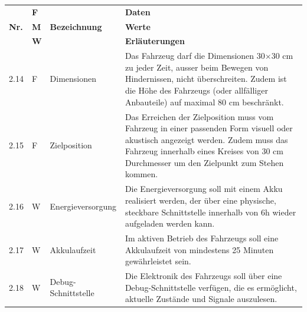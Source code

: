 \documentclass[../main.tex]{subfiles}
\begin{document}
\newpage

\begin{tabular}{|l|p{0.5cm}|p{4cm}|p{10cm}|}
  \hline
               & \textbf{F} &                           & \textbf{Daten}                                                                                                                                                                                                              \\
  \textbf{Nr.} & \textbf{M} & \textbf{Bezeichnung}      & \textbf{Werte}                                                                                                                                                                                                              \\
               & \textbf{W} &                           & \textbf{Erläuterungen}                                                                                                                                                                                                      \\
  \hline
  2.14         & F          & Dimensionen               & Das Fahrzeug darf die Dimensionen 30$\times$30 cm zu jeder Zeit, ausser beim Bewegen von Hindernissen, nicht überschreiten. Zudem ist die Höhe des Fahrzeugs (oder allfälliger Anbauteile) auf maximal 80 cm beschränkt.    \\
  \hline
  2.15         & F          & Zielposition              & Das Erreichen der Zielposition muss vom Fahrzeug in einer passenden Form visuell oder akustisch angezeigt werden. Zudem muss das Fahrzeug innerhalb eines Kreises von 30 cm Durchmesser um den Zielpunkt zum Stehen kommen. \\
  \hline
  2.16         & W          & Energieversorgung         & Die Energieversorgung soll mit einem Akku realisiert werden, der über eine physische, steckbare Schnittstelle innerhalb von 6h wieder aufgeladen werden kann.                                                               \\
  \hline
  2.17         & W          & Akkulaufzeit              & Im aktiven Betrieb des Fahrzeugs soll eine Akkulaufzeit von mindestens 25 Minuten gewährleistet sein.                                                                                                                       \\
  \hline
  2.18         & W          & Debug-Schnittstelle       & Die Elektronik des Fahrzeugs soll über eine Debug-Schnittstelle verfügen, die es ermöglicht, aktuelle Zustände und Signale auszulesen.                                                                                      \\

\end{tabular}
\end{document}
